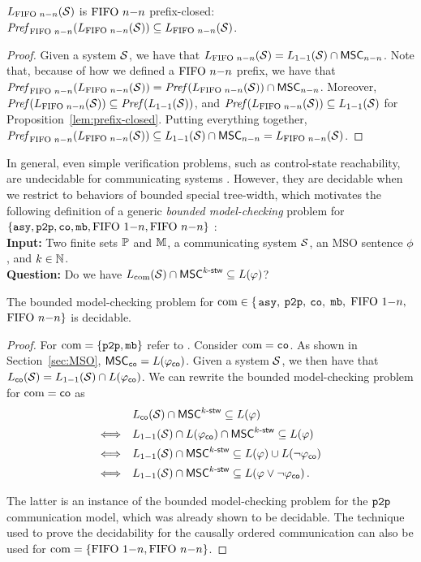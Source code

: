 \begin{proposition}\label{lem:nn-prefix-closed}
	$L_{\text{FIFO } n\mathsf{-}n}(\mathcal{S})$ is $\text{FIFO } n\mathsf{-}n$ prefix-closed:
	$\mathit{Pref}_{\text{FIFO } n\mathsf{-}n}(L_{\text{FIFO } n\mathsf{-}n}(\mathcal{S})) \subseteq L_{\text{FIFO } n\mathsf{-}n}(\mathcal{S})$.
\end{proposition}
\begin{proof}
	Given a system $\mathcal{S}$, we have that $L_{\text{FIFO } n\mathsf{-}n}(\mathcal{S}) = L_{1\mathsf{-}1}(\mathcal{S}) \cap \mathsf{MSC}_{n\mathsf{-}n}$. Note that, because of how we defined a $\text{FIFO } n\mathsf{-}n$ prefix, we have that $\mathit{Pref}_{\text{FIFO } n\mathsf{-}n}(L_{\text{FIFO } n\mathsf{-}n}(\mathcal{S})) = \mathit{Pref}(L_{\text{FIFO } n\mathsf{-}n}(\mathcal{S})) \cap \mathsf{MSC}_{n\mathsf{-}n}$. Moreover, $\mathit{Pref}(L_{\text{FIFO } n\mathsf{-}n}(\mathcal{S})) \subseteq \mathit{Pref}(L_{1\mathsf{-}1}(\mathcal{S}))$, and $\mathit{Pref}(L_{\text{FIFO } n\mathsf{-}n}(\mathcal{S})) \subseteq L_{1\mathsf{-}1}(\mathcal{S})$ for Proposition~\ref{lem:prefix-closed}. Putting everything together, $\mathit{Pref}_{\text{FIFO } n\mathsf{-}n}(L_{\text{FIFO } n\mathsf{-}n}(\mathcal{S})) \subseteq L_{1\mathsf{-}1}(\mathcal{S}) \cap \mathsf{MSC}_{n\mathsf{-}n} = L_{\text{FIFO } n\mathsf{-}n}(\mathcal{S})$.
\end{proof}

In general, even simple verification problems, such
as control-state reachability, are undecidable for
communicating systems \cite{DBLP:journals/jacm/BrandZ83}.
However, they are decidable when we restrict to behaviors of
bounded special tree-width, which motivates the following
definition of a generic \emph{bounded model-checking} problem for $\{\mathtt{asy}, \mathtt{p2p}, \mathtt{co}, \mathtt{mb}, \text{FIFO } 1\mathsf{-}n, \text{FIFO } n\mathsf{-}n \}$ :\\
%
{\bf Input:} Two finite sets $\mathbb{P}$ and $\mathbb{M}$, a communicating system $\mathcal{S}$, an MSO sentence $\phi$, and $k \in \mathbb{N}$.\\
%
{\bf Question:} Do we have $L_{\textup{com}}(\mathcal{S}) \cap \mathsf{MSC}^{k\textup{-}\mathsf{stw}} \subseteq L(\varphi)$?

\begin{theorem}
	\label{thm:bounded_model_checking}
	The bounded model-checking problem for $\textup{com} \in \{$$\mathtt{asy}, $ $\mathtt{p2p}, $ $\mathtt{co}, $ $\mathtt{mb}, $ $\text{FIFO } 1\mathsf{-}n, $ $\text{FIFO } n\mathsf{-}n\}$ is decidable.
\end{theorem}

\begin{proof}
    For $\textup{com} = \{\mathtt{p2p}, \mathtt{mb}\}$ refer to \cite{DBLP:conf/concur/BolligGFLLS21}. 
    Consider $\textup{com} = \mathtt{co}$. As shown in Section~\ref{sec:MSO}, $\mathsf{MSC}_{\mathtt{co}}=L(\varphi_{\mathsf{co}})$. Given a system $\mathcal{S}$, we then have that $L_{\mathsf{co}}(\mathcal{S}) = L_{1\mathsf{-}1}(\mathcal{S}) \cap L(\varphi_{\mathsf{co}})$. We can rewrite the bounded model-checking problem for $\textup{com} = \mathsf{co}$ as
    \[\begin{array}{rl}
    &L_{\mathsf{co}}(\mathcal{S}) \cap \mathsf{MSC}^{k\textup{-}\mathsf{stw}} \subseteq L(\varphi)\\[1ex]
    \Longleftrightarrow &L_{1\mathsf{-}1}(\mathcal{S}) \cap L(\varphi_{\mathsf{co}}) \cap \mathsf{MSC}^{k\textup{-}\mathsf{stw}} \subseteq L(\varphi)\\[1ex]
    \Longleftrightarrow &L_{1\mathsf{-}1}(\mathcal{S}) \cap \mathsf{MSC}^{k\textup{-}\mathsf{stw}} \subseteq L(\varphi) \cup L(\neg \varphi_{\mathsf{co}})\\[1ex]
    \Longleftrightarrow &L_{1\mathsf{-}1}(\mathcal{S}) \cap \mathsf{MSC}^{k\textup{-}\mathsf{stw}} \subseteq L(\varphi \vee \neg \varphi_{\mathsf{co}})\,.
    \end{array}\]

    The latter is an instance of the bounded model-checking problem for the $\mathtt{p2p}$ communication model, which was already shown to be decidable. The technique used to prove the decidability for the causally ordered communication can also be used for $\textup{com} = \{\text{FIFO } 1\mathsf{-}n, \text{FIFO } n\mathsf{-}n\}$.
\end{proof}

